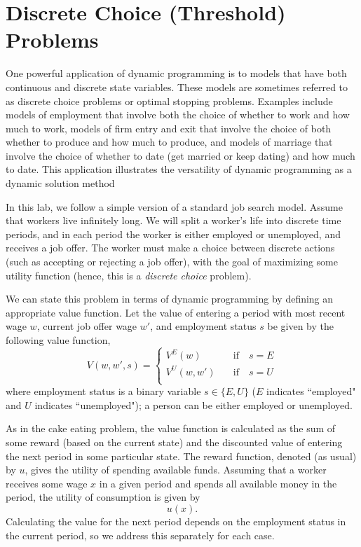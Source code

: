 
\section*{Discrete Choice (Threshold) Problems}\label{SecDiscrChoice}

One powerful application of dynamic programming is
to models that have both continuous and discrete state variables. These models are sometimes referred to as
discrete choice problems or optimal stopping problems.  Examples include models of employment that involve both
the choice of whether to work and how much to work, models of firm entry and exit that involve the choice of both
whether to produce and how much to produce, and models of marriage that involve the choice of whether to date
(get married or keep dating) and how much to date.
This application illustrates the versatility of dynamic programming as a dynamic solution method

In this lab, we follow a simple version of a standard job search model.
Assume that workers live infinitely long.
We will split a worker's life into discrete time periods, and in each period the worker is either
employed or unemployed, and receives a job offer. The worker must make a choice between discrete actions
(such as accepting or rejecting a job offer), with the goal of maximizing some utility function (hence,
this is a \emph{discrete choice} problem).

We can state this problem in terms of dynamic programming by defining an appropriate value function.
Let the value of entering a period with most recent wage $w$,
current job offer wage $w'$, and employment status $s$ be given by the following value function,
\begin{equation}\label{EqV}
   V(w,w',s) = \begin{cases}
                  V^E(w)    \quad&\text{if}\quad s = E \\
                  V^U(w,w') \quad&\text{if}\quad s = U \\
               \end{cases}
\end{equation}
where employment status is a binary variable $s\in\{E,U\}$ ($E$ indicates ``employed" and $U$ indicates ``unemployed");
a person can be either employed or unemployed.

As in the cake eating problem, the value function is calculated as the sum of some reward (based on the
current state) and the discounted value of entering the next period in some particular state.
The reward function, denoted (as usual) by $u$, gives the utility of spending available funds.
Assuming that a worker receives some wage $x$ in a given period and spends all available money in the period,
the utility of consumption is given by
\[
u(x).
\]
Calculating the value for the next period depends on the employment status in the current period, so we address
this separately for each case.

